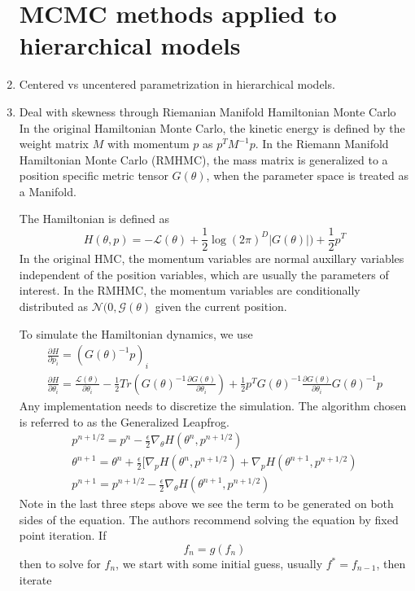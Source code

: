 \documentclass{book}
\begin{document}
\begin{enumerate}
\section{MCMC methods applied to hierarchical models}
\item Centered vs uncentered parametrization in hierarchical models.

\item Deal with skewness through Riemanian Manifold Hamiltonian Monte Carlo
In the original Hamiltonian Monte Carlo, the kinetic energy is defined by the weight matrix $M$ with momentum $p$ as $p^T M^{-1}p$. In the Riemann Manifold Hamiltonian Monte Carlo (RMHMC), the mass matrix is generalized to a position specific metric tensor $G(\theta)$, when the parameter space is treated as a Manifold.

The Hamiltonian is defined as 
\[ H(\theta, p) = - \mathcal{L}(\theta)  + \frac{1}{2} \log (2\pi)^D|G(\theta)|) + \frac{1}{2}p^T \]
In the original HMC, the momentum variables are normal auxillary variables independent of the position variables, which are usually the parameters of interest. In the RMHMC, the momentum variables are conditionally distributed as $\mathcal{N(0,G(\theta)}$ given the current position.

To simulate the Hamiltonian dynamics, we use 
\begin{align}
\frac{\partial H}{\partial p_i} = (G(\theta)^{-1}p)_i \\
\frac{\partial H}{\partial \theta_i} = \frac{\mathcal{L}(\theta)}{\partial \theta_i} - \frac{1}{2} Tr(G(\theta)^{-1} \frac{\partial G(\theta)}{\partial \theta_i})+ \frac{1}{2}p^TG(\theta)^{-1}\frac{\partial G(\theta)}{\partial \theta_i} G(\theta)^{-1}p 
\end{align}
Any implementation needs to discretize the simulation. The algorithm chosen is referred to as the Generalized Leapfrog.
\begin{align}
p^{n+1/2} = p^n - \frac{\epsilon}{2} \nabla_{\theta}H(\theta^n,p^{n+1/2}) \\
\theta^{n+1}  = \theta^n + \frac{\epsilon}{2} [ \nabla_p H(\theta^n, p^{n+1/2})+\nabla_p H(\theta^{n+1},p^{n+1/2}) \\
p^{n+1} = p^{n+1/2} - \frac{\epsilon}{2} \nabla_\theta H(\theta^{n+1},p^{n+1/2}) 
\end{align}
Note in the last three steps above we see the term to be generated on both sides of the equation. The authors recommend solving the equation by fixed point iteration.
If 
\[f_n = g(f_n) \]
then to solve for $f_n$, we start with some initial guess, usually $f^*=f_{n-1}$, then iterate 


\end{enumerate}
\end{document}
